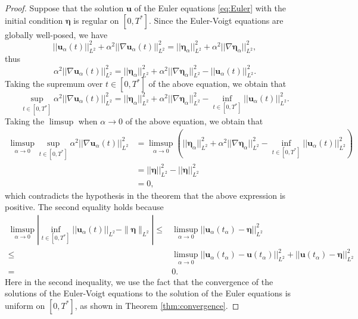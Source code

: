 \documentclass[leqno,10pt,a4paper]{amsart}
\theoremstyle{definition}
\numberwithin{equation}{section}
\newcommand{\bds}{\boldsymbol}
\def\bbeta{\boldsymbol{\eta}}
\begin{document}
\begin{proof}
Suppose that the solution $\bds u$ of the Euler equations \eqref{eq:Euler} with the initial condition $\bbeta$ is regular
on $[0, T^*]$.
Since the Euler-Voigt equations are globally well-posed, we have 
%
\begin{equation}
||\bds u_\alpha(t)||^2_{L^2} + \alpha^2 ||\nabla \bds u_\alpha(t)||^2_{L^2}  = 
||\bbeta_\alpha||^2_{L^2} + \alpha^2 ||\nabla\bbeta_\alpha||^2_{L^2},
\end{equation}
%
thus
%
\begin{equation}
 \alpha^2 ||\nabla \bds u_\alpha(t)||^2_{L^2}  = 
||\bbeta_\alpha||^2_{L^2} + \alpha^2 ||\nabla\bbeta_\alpha||^2_{L^2} - ||\bds u_\alpha(t)||^2_{L^2}.
\end{equation}
%
Taking the supremum over $t\in[0,T^*]$ of the above equation, we obtain that
\begin{equation}
\sup_{t\in[0,T^*]}\alpha^2 ||\nabla \bds u_\alpha(t)||^2_{L^2} = 
||\bbeta_\alpha||^2_{L^2} + \alpha^2 ||\nabla\bbeta_\alpha||^2_{L^2} - \inf_{t\in[0, T^*]} ||\bds u_\alpha(t)||^2_{L^2}.
\end{equation}
%
Taking the $\limsup$ when $\alpha \to 0$ of the above equation, we obtain that
%
\begin{equation}
\begin{aligned}
\limsup_{\alpha\to 0} \sup_{t\in[0,T^*]}\alpha^2 ||\nabla \bds u_\alpha(t)||^2_{L^2} 
&= \limsup_{\alpha\to 0} \left(||\bbeta_\alpha||^2_{L^2} + \alpha^2 ||\nabla\bbeta_\alpha||^2_{L^2} - \inf_{t\in[0, T^*]} ||\bds u_\alpha(t)||^2_{L^2}\right)\\
&= ||\bbeta||^2_{L^2} - ||\bbeta||^2_{L^2} \\
& = 0,
\end{aligned}
\end{equation}
%
which contradicts the hypothesis in the theorem that the above expression is positive.
The second equality holds because
%
\begin{align*}
\limsup_{\alpha\to 0} \left|\inf_{t\in[0, T^*]} ||\bds u_\alpha(t)||_{L^2} - \| \bbeta\|_{L^2}\right| 
\leq  &\limsup_{\alpha\to 0}||\bds u_\alpha(t_\alpha) - \bbeta||^2_{L^2}  \\
\leq & \limsup_{\alpha\to 0} ||\bds u_\alpha(t_\alpha) - \bds u(t_\alpha)||^2_{L^2}
+ ||\bds u(t_\alpha) - \bbeta||^2_{L^2} \\
= &0.
\end{align*}
%
Here in the second inequality, we use the fact that the convergence of the solutions of the Euler-Voigt equations to the solution of the Euler equations is uniform on $[0, T^*]$, as shown in Theorem \ref{thm:convergence}.




\end{proof}
 
\end{document}
